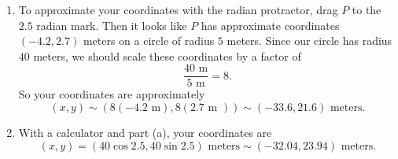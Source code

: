 \documentclass{ximera}
\begin{document}
\begin{example}
\begin{explanation}
\begin{enumerate}
\item To approximate your coordinates with the radian protractor, drag $P$ to the $2.5$ radian mark. Then it looks like $P$ has approximate coordinates $(-4.2 , 2.7)$ meters on a circle of radius $5$ meters. Since our circle has radius $40$ meters, we should scale these coordinates by a factor of 
\[
    \frac{40\text{ m}}{5\text{ m}} = 8.
\]
So your coordinates are approximately
\[
     (x,y) \sim (8(-4.2\text{ m}) , 8(2.7\text{ m })) \sim (-33.6 , 21.6 ) \text{ meters}.
\]

\item With a calculator and part (a), your coordinates are 
\[
   (x,y) = (40 \cos 2.5 , 40 \sin 2.5) \text{ meters} \sim (-32.04, 23.94 )\text{ meters}.
\]

\end{enumerate}

\end{explanation}


\end{example}
\end{document}
